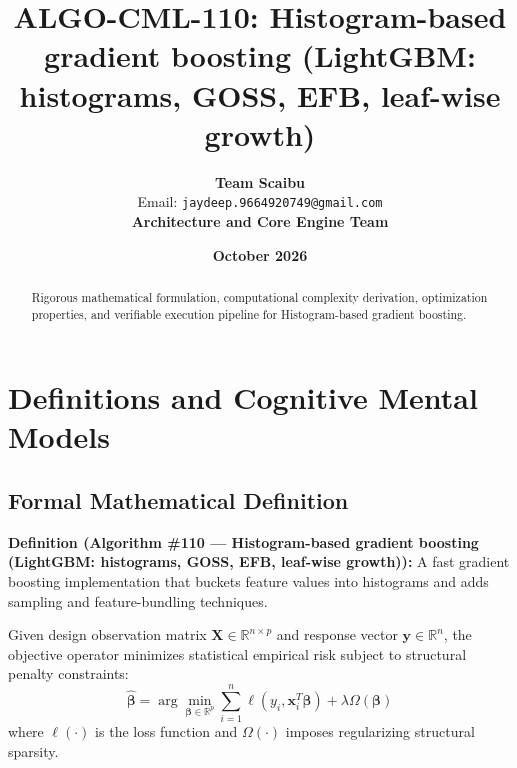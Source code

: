 \documentclass[11pt,a4paper]{article}
\title{\textbf{ALGO-CML-110: Histogram-based gradient boosting (LightGBM: histograms, GOSS, EFB, leaf-wise growth)}}
\author{\textbf{Team Scaibu} \\ \small Email: \texttt{jaydeep.9664920749@gmail.com} \\ \small \textbf{Architecture and Core Engine Team}}
\date{\textbf{October 2026}}
\theoremstyle{definition}
\begin{document}
\maketitle

\begin{abstract}
Rigorous mathematical formulation, computational complexity derivation, optimization properties, and verifiable execution pipeline for Histogram-based gradient boosting.
\end{abstract}

\section{Definitions and Cognitive Mental Models}

\subsection{Formal Mathematical Definition}
\textbf{Definition (Algorithm \#110 --- Histogram-based gradient boosting (LightGBM: histograms, GOSS, EFB, leaf-wise growth)):}
A fast gradient boosting implementation that buckets feature values into histograms and adds sampling and feature-bundling techniques.

Given design observation matrix $\mathbf{X} \in \mathbb{R}^{n \times p}$ and response vector $\mathbf{y} \in \mathbb{R}^n$, the objective operator minimizes statistical empirical risk subject to structural penalty constraints:
\begin{equation}
\hat{\boldsymbol{\beta}} = \arg\min_{\boldsymbol{\beta} \in \mathbb{R}^p} \sum_{i=1}^n \ell(y_i, \mathbf{x}_i^T \boldsymbol{\beta}) + \lambda \Omega(\boldsymbol{\beta})
\end{equation}
where $\ell(\cdot)$ is the loss function and $\Omega(\cdot)$ imposes regularizing structural sparsity.
\end{document}

